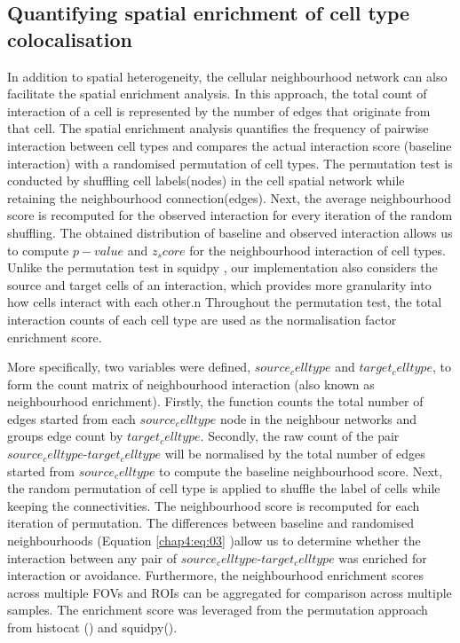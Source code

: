 \subsection{Quantifying spatial enrichment of cell type colocalisation}
In addition to spatial heterogeneity, the cellular neighbourhood network can also facilitate the spatial enrichment analysis. In this approach, the total count of interaction of a cell is represented by the number of edges that originate from that cell. The spatial enrichment analysis quantifies the frequency of pairwise interaction between cell types and compares the actual interaction score (baseline interaction) with a randomised permutation of cell types. The permutation test is conducted by shuffling cell labels(nodes) in the cell spatial network while retaining the neighbourhood connection(edges). Next, the average neighbourhood score is recomputed for the observed interaction for every iteration of the random shuffling. The obtained distribution of baseline and observed interaction allows us to compute $p-value$ and $z_score$ for the neighbourhood interaction of cell types. Unlike the permutation test in squidpy \cite{palla2022squidpy}, our implementation also considers the source and target cells of an interaction, which provides more granularity into how cells interact with each other.n Throughout the permutation test, the total interaction counts of each cell type are used as the normalisation factor enrichment score.    

More specifically, two variables were defined, $source_celltype$ and $target_celltype$, to form the count matrix of neighbourhood interaction (also known as neighbourhood enrichment). Firstly, the function counts the total number of edges started from each $source_celltype$ node in the neighbour networks and groups edge count by $target_celltype$. Secondly, the raw count of the pair $source_celltype$-$target_celltype$ will be normalised by the total number of edges started from $source_celltype$ to compute the baseline neighbourhood score. Next, the random permutation of cell type is applied to shuffle the label of cells while keeping the connectivities. The neighbourhood score is recomputed for each iteration of permutation. The differences between baseline and randomised neighbourhoods (Equation \ref{chap4:eq:03} )allow us to determine whether the interaction between any pair of $source_celltype$-$target_celltype$ was enriched for interaction or avoidance. Furthermore, the neighbourhood enrichment scores across multiple FOVs and ROIs can be aggregated for comparison across multiple samples. The enrichment score was leveraged from the permutation approach from histocat (\cite{schapiro2017histocat}) and squidpy(\cite{palla2022squidpy}).

